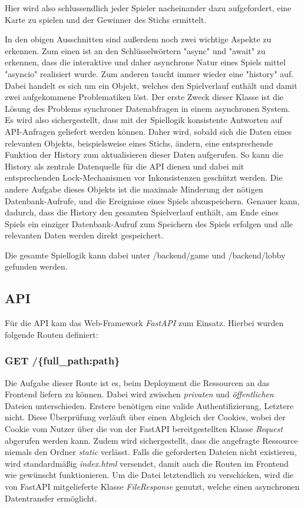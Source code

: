 Hier wird also schlussendlich jeder Spieler nacheinander dazu aufgefordert, eine Karte zu spielen und der Gewinner des Stichs ermittelt.

In den obigen Ausschnitten sind außerdem noch zwei wichtige Aspekte zu erkennen. Zum einen ist an den Schlüsselwörtern "async" und "await" zu erkennen, dass die interaktive und daher asynchrone Natur eines Spiels mittel "asyncio" realisiert wurde. Zum anderen taucht immer wieder eine "history" auf. Dabei handelt es sich um ein Objekt, welches den Spielverlauf enthält und damit zwei aufgekommene Problematiken löst. Der erste Zweck dieser Klasse ist die Lösung des Problems synchroner Datenabfragen in einem asynchronen System. Es wird also sichergestellt, dass mit der Spiellogik konsistente Antworten auf API-Anfragen geliefert werden können. Daher wird, sobald sich die Daten eines relevanten Objekts, beispielsweise eines Stichs, ändern, eine entsprechende Funktion der History zum aktualisieren dieser Daten aufgerufen. So kann die History als zentrale Datenquelle für die API dienen und dabei mit entsprechenden Lock-Mechanismen vor Inkonsistenzen geschützt werden. Die andere Aufgabe dieses Objekts ist die maximale Minderung der nötigen Datenbank-Aufrufe, und die Ereignisse eines Spiels abzuspeichern. Genauer kann, dadurch, dass die History den gesamten Spielverlauf enthält, am Ende eines Spiels ein einziger Datenbank-Aufruf zum Speichern des Spiels erfolgen und alle relevanten Daten werden direkt gespeichert.

Die gesamte Spiellogik kann dabei unter /backend/game und /backend/lobby gefunden werden.

\subsection{API}
Für die API kam das Web-Framework \textit{FastAPI} zum Einsatz. Hierbei wurden folgende Routen definiert:

\subsubsection{GET /\{full\_path:path\}}
Die Aufgabe dieser Route ist es, beim Deployment die Ressourcen an das Frontend liefern zu können. Dabei wird zwischen \textit{privaten} und \textit{öffentlichen} Dateien unterschieden. Erstere benötigen eine valide Authentifizierung, Letztere nicht. Diese Überprüfung verläuft über einen Abgleich der Cookies, wobei der Cookie vom Nutzer über die von der FastAPI bereitgestellten Klasse \textit{Request} abgerufen werden kann. Zudem wird sichergestellt, dass die angefragte Ressource niemals den Ordner \textit{static} verlässt. Falls die geforderten Dateien nicht existieren, wird standardmäßig \textit{index.html} versendet, damit auch die Routen im Frontend wie gewünscht funktionieren. Um die Datei letztendlich zu verschicken, wird die von FastAPI mitgelieferte Klasse \textit{FileResponse} genutzt, welche einen asynchronen Datentransfer ermöglicht. \cite{fastapi-fileresponse}

